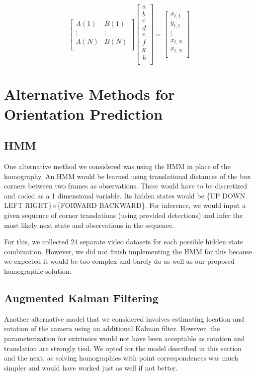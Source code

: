 \documentclass[letterpaper,10pt,conference]{IEEEtran}
\begin{document}
\begin{equation}
\begin{bmatrix}
A(1)& B(1)\\
\vdots&\vdots\\
A(N)& B(N) \\
\end{bmatrix}
\begin{bmatrix}
a\\
b\\
c\\
d\\
e\\
f\\
g\\
h\\
\end{bmatrix} = 
\begin{bmatrix}
x_{t,1}\\
y_{t,1}\\
\vdots\\
x_{t,N}\\
x_{t,N}\\
\end{bmatrix}
\end{equation}

\section{Alternative Methods for Orientation Prediction}
\subsection{HMM}
One alternative method we considered was using the HMM in place of the homography. An HMM would be learned using translational distances of the box corners between two frames as observations. These would have to be discretized and coded as a 1 dimensional variable. Its hidden states would be \{UP DOWN LEFT RIGHT\}$\times$\{FORWARD BACKWARD\}. For inference, we would input a given sequence of corner translations (using provided detections) and infer the most likely next state and observations in the sequence.

For this, we collected 24 separate video datasets for each possible hidden state combination. However, we did not finish implementing the HMM for this because we expected it would be too complex and  barely do as well as our proposed homographic solution.
\subsection{Augmented Kalman Filtering}
Another alternative model that we considered involves estimating location and rotation of the camera using an additional Kalman filter.  However, the parameterization for extrinsics would not have been acceptable as rotation and translation are strongly tied.  We opted for the model described in this section and the next, as solving homographies with point correspondences was much simpler and would have worked just as well if not better.
\end{document}
